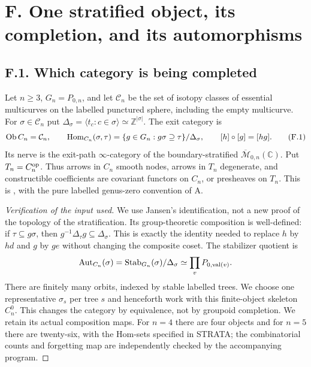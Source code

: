 \section{F. One stratified object, its completion, and its automorphisms}
\subsection{F.1. Which category is being completed}

Let $n\geq3$, $G_n=P_{0,n}$, and let $\mathcal C_n$ be the set of isotopy classes of essential multicurves on the labelled punctured sphere, including the empty multicurve. For $\sigma\in\mathcal C_n$ put $\Delta_\sigma=\langle t_c:c\in\sigma\rangle\simeq\mathbb Z^{|\sigma|}$. The exit category is
\[
 \operatorname{Ob}C_n=\mathcal C_n,\qquad
 \operatorname{Hom}_{C_n}(\sigma,\tau)=
 \{g\in G_n:g\sigma\supseteq\tau\}/\Delta_\sigma,
 \qquad [h]\circ[g]=[hg].                                      \tag{F.1}
\]
Its nerve is the exit-path $\infty$-category of the boundary-stratified $\overline{\mathscr M}_{0,n}(\mathbb C)$. Put $T_n=C_n^{\mathrm{op}}$. Thus arrows in $C_n$ smooth nodes, arrows in $T_n$ degenerate, and constructible coefficients are covariant functors on $C_n$, or presheaves on $T_n$.
This is \citet[Construction 3.18, Proposition 3.23, Corollary 6.6, and Theorem 6.7]{AF_Jansen2023}, with the pure labelled genus-zero convention of A.
\begin{proof}[Verification of the input used]
We use Jansen's identification, not a new proof of the topology of the stratification. Its group-theoretic composition is well-defined: if $\tau\subseteq g\sigma$, then $g^{-1}\Delta_\tau g\subseteq\Delta_\sigma$. This is exactly the identity needed to replace $h$ by $hd$ and $g$ by $ge$ without changing the composite coset. The stabilizer quotient is
\[
\operatorname{Aut}_{C_n}(\sigma)=\operatorname{Stab}_{G_n}(\sigma)/\Delta_\sigma
 \simeq\prod_v P_{0,\operatorname{val}(v)}.
\]
There are finitely many orbits, indexed by stable labelled trees. We choose one representative $\sigma_s$ per tree $s$ and henceforth work with this finite-object skeleton $C_n^0$. This changes the category by equivalence, not by groupoid completion. We retain its actual composition maps. For $n=4$ there are four objects and for $n=5$ there are twenty-six, with the Hom-sets specified in STRATA; the combinatorial counts and forgetting map are independently checked by the accompanying program.
\end{proof}

